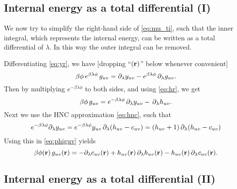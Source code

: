 \documentclass[12pt]{article}
\begin{document}
\subsection{Internal energy as a total differential (I)}


We now try to simplify the right-hand side of \eqref{eq:mu_ti}, such that
the inner integral, which represents the internal energy, can be written
as a total differential of $\lambda$.
%
In this way the outer integral can be removed.

Differentiating \eqref{eq:yr}, we have [dropping ``$(\mathbf{r})$'' below whenever convenient]
\[
  \beta \phi \, e^{ \beta \lambda \phi } \, g_{uv}
  =
  \partial_\lambda y_{uv}
    -
    e^{ \beta \lambda \phi } \, \partial_\lambda g_{uv}.
\]
Then by multiplying $e^{-\beta \lambda \phi}$ to both sides,
and using \eqref{eq:hr}, we get
\begin{equation}
  \beta \phi \, g_{uv}
  =
  e^{ -\beta \lambda \phi } \, \partial_\lambda y_{uv}
  - \, \partial_\lambda h_{uv}.
  \label{eq:phiguv}
\end{equation}
%
Next we use the HNC approximation \eqref{eq:hnc}, such that
%
\begin{align*}
  e^{ -\beta \lambda \phi} \partial_\lambda y_{uv}
  = e^{ -\beta \lambda \phi} y_{uv} \, \partial_\lambda (h_{uv} - c_{uv})
  = (h_{uv} + 1) \, \partial_\lambda (h_{uv} - c_{uv})
\end{align*}
%
Using this in \eqref{eq:phiguv} yields
\begin{equation}
  \beta \phi(\mathbf{r}) \, g_{uv}(\mathbf{r})
  =
  - \partial_\lambda c_{uv}(\mathbf{r}) + h_{uv}(\mathbf{r}) \, \partial_\lambda h_{uv}(\mathbf{r}) - h_{uv}(\mathbf{r}) \, \partial_\lambda c_{uv}(\mathbf{r}).
  \label{eq:hc1}
\end{equation}



\subsection{Internal energy as a total differential (II)}
\end{document}
